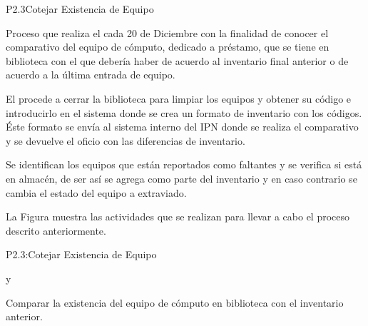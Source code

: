 
\begin{Proceso}{P2.3}{Cotejar Existencia de Equipo} {
  

  Proceso que realiza el  cada 20 de Diciembre con la finalidad de conocer el comparativo del equipo de cómputo, dedicado a préstamo, que se tiene en biblioteca  con el que debería haber de acuerdo al inventario final anterior o de acuerdo a la última entrada de equipo.
  
  El  procede a cerrar la biblioteca para limpiar los equipos y obtener su código e introducirlo en el sistema donde se crea un formato de inventario con los códigos.  Éste formato se envía al sistema interno del IPN donde se realiza el comparativo y se devuelve el oficio con las diferencias de inventario.
  
  Se identifican los equipos que están reportados como faltantes y se verifica si está en almacén, de ser así se agrega como parte del inventario y en caso contrario se cambia el estado del equipo a extraviado.
  
  \noindent La Figura  muestra las actividades que se realizan para llevar a cabo el proceso descrito anteriormente.


} {P2.3:Cotejar Existencia de Equipo}

   { %
     y 
  }

   { %
    Comparar la existencia del equipo de cómputo en biblioteca con el inventario anterior.
  }


\end{Proceso}
